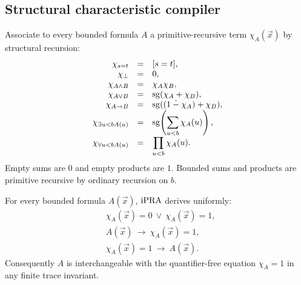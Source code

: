 \subsection{Structural characteristic compiler}

\begin{construction}
Associate to every bounded formula \(A\) a primitive-recursive term
\(\chi_A(\vec x)\) by structural recursion:
\[
\begin{array}{rcl}
\chi_{s=t}&=&[s=t],\\
\chi_{\bot}&=&0,\\
\chi_{A\wedge B}&=&\chi_A\chi_B,\\
\chi_{A\vee B}&=&\operatorname{sg}(\chi_A+\chi_B),\\
\chi_{A\to B}&=&\operatorname{sg}((1\mathbin{\dot-}\chi_A)+\chi_B),\\
\chi_{\exists u<b A(u)}&=&\operatorname{sg}\!\left(\displaystyle\sum_{u<b}\chi_A(u)\right),\\
\chi_{\forall u<b A(u)}&=&\displaystyle\prod_{u<b}\chi_A(u).
\end{array}
\]
Empty sums are \(0\) and empty products are \(1\).  Bounded sums and products are
primitive recursive by ordinary recursion on \(b\).
\end{construction}

\begin{theorem}
\label{thm:booleanization}
For every bounded formula \(A(\vec x)\), \(\mathrm{iPRA}\) derives uniformly:
\begin{align}
  &\chi_A(\vec x)=0\ \vee\ \chi_A(\vec x)=1,\label{eq:boolean-range}\\
  &A(\vec x)\ \longrightarrow\ \chi_A(\vec x)=1,\label{eq:to-char}\\
  &\chi_A(\vec x)=1\ \longrightarrow\ A(\vec x).\label{eq:from-char}
\end{align}
Consequently \(A\) is interchangeable with the quantifier-free equation
\(\chi_A=1\) in any finite trace invariant.
\end{theorem}

